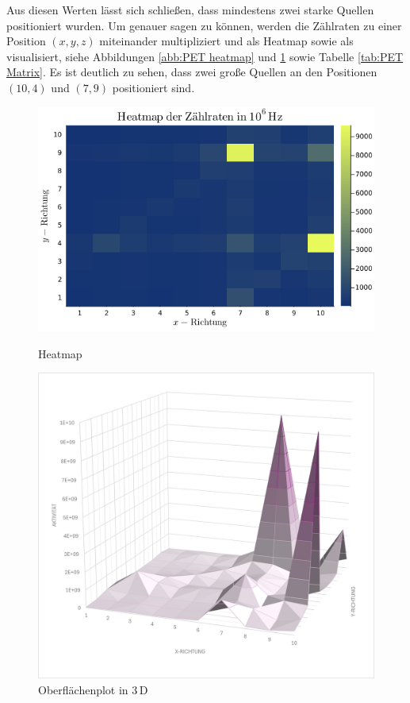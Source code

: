 \documentclass[12pt,a4paper]{scrartcl}
\numberwithin{equation}{section} %
\begin{document}
Aus diesen Werten lässt sich schließen, dass mindestens zwei starke Quellen positioniert wurden. Um genauer sagen zu können, werden die Zählraten zu einer Position $(x,y,z)$ miteinander multipliziert und als Heatmap sowie als visualisiert, siehe Abbildungen \ref{abb:PET heatmap} und \ref{abb:PET surface} sowie Tabelle \ref{tab:PET Matrix}. Es ist deutlich zu sehen, dass zwei große Quellen an den Positionen $(10,4)$ und $(7,9)$ positioniert sind.

\begin{figure}[h!]
	\centering
	\begin{minipage}[t]{0.7\textwidth}
		\includegraphics[width=\textwidth]{../media/B3.4/heatmap.png}
		\caption{Heatmap}
		\label{abb:PET heatmap}
	\end{minipage}

	\vspace{24pt}
	\begin{minipage}[t]{0.7\textwidth}
		\includegraphics[width=\textwidth]{../media/B3.4/PET_surface.jpg}
		\caption{Oberflächenplot in $3\,\mathrm D$}
		\label{abb:PET surface}
	\end{minipage}
\end{figure}
\end{document}
